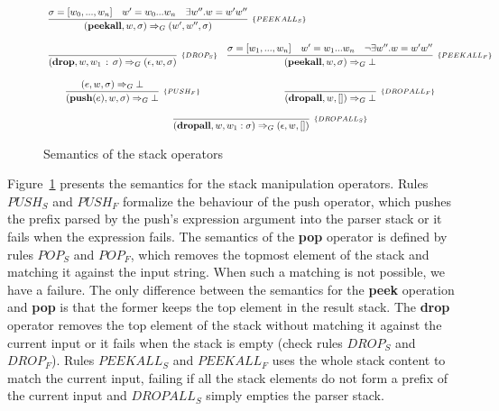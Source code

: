 \documentclass[sigplan,screen]{acmart}
\theoremstyle{definition}
\begin{document}
\begin{figure}[h!]
\[\begin{array}{ccc}
      \multicolumn{2}{c}{
        \infer[_{\{PEEKALL_S\}}]
              {(\mathbf{peekall},w,\sigma)\Rightarrow_G (w', w'',\sigma)}
              {\sigma = [w_0, ..., w_n] & w' = w_0...w_n & \exists w'' . w = w'w''}
      }\\
      & & \\
      \infer[_{\{DROP_S\}}]
            {(\mathbf{drop},w,w_1\,:\,\sigma)\Rightarrow_G (\epsilon,w,\sigma)}
            {}
              &
      \multicolumn{2}{c}{
        \infer[_{\{PEEKALL_F\}}]
              {(\mathbf{peekall},w,\sigma)\Rightarrow_G \bot}
              {\sigma = [w_1, ..., w_n] & w' = w_1...w_n & \neg \exists w'' . w = w'w''}
            }
         \\ & & \\
         \infer[_{\{PUSH_F\}}]
              {(\mathbf{push}(e),w,\sigma)\Rightarrow_G \bot}
              {(e,w,\sigma)\Rightarrow_G \bot} &
         \multicolumn{2}{c}{
             \infer[_{\{DROPALL_F\}}]
                   {(\mathbf{dropall}, w, [])\Rightarrow_G \bot}
                   {}
          } \\ & & \\
          \multicolumn{3}{c}{
           \infer[_{\{DROPALL_S\}}]
                 {(\mathbf{dropall}, w, w_1 : \sigma)\Rightarrow_G (\epsilon, w, [])}
                 {}
          }
  \end{array}
  \]
  \caption{Semantics of the stack operators}
  \label{fig:newsemantics}
\end{figure}

Figure~\ref{fig:newsemantics} presents the semantics for the stack manipulation operators.
Rules $PUSH_S$ and $PUSH_F$ formalize the behaviour of the push operator, which pushes the
prefix parsed by the push's expression argument into the parser stack or it fails when
the expression fails. The semantics of the \textbf{pop} operator is defined by rules
$POP_S$ and $POP_F$, which removes the topmost element of the stack and matching it
against the input string. When such a matching is not possible, we have a failure.
The only difference between the semantics for the \textbf{peek} operation and \textbf{pop}
is that the former keeps the top element in the result stack.
The \textbf{drop} operator removes the top element of the stack without matching it
against the current input or it fails when the stack is empty (check rules $DROP_S$ and
$DROP_F$). Rules $PEEKALL_S$ and $PEEKALL_F$ uses the whole stack content to match
the current input, failing if all the stack elements do not form a prefix of the current
input and $DROPALL_S$ simply empties the parser stack.
\end{document}
